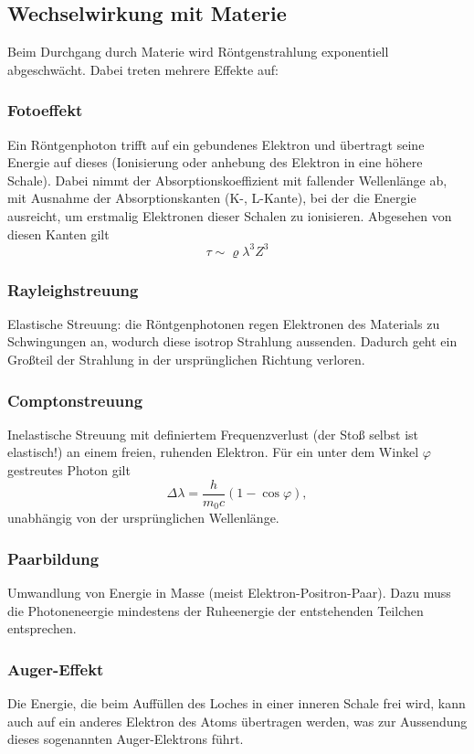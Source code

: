 \documentclass[a4paper]{scrartcl}
\begin{document}
\subsection{Wechselwirkung mit Materie}
Beim Durchgang durch Materie wird Röntgenstrahlung exponentiell abgeschwächt. Dabei treten mehrere Effekte auf:
\subsubsection{Fotoeffekt}
Ein Röntgenphoton trifft auf ein gebundenes Elektron und übertragt seine Energie auf dieses (Ionisierung oder anhebung des Elektron in eine höhere Schale). Dabei nimmt der Absorptionskoeffizient mit fallender Wellenlänge ab, mit Ausnahme der Absorptionskanten (K-, L-Kante), bei der die Energie ausreicht, um erstmalig Elektronen dieser Schalen zu ionisieren. Abgesehen von diesen Kanten gilt 
\begin{equation*}
  \tau \sim \varrho \lambda^3Z^3
  \label{equ:RoentgenAbsorption}
\end{equation*}
\subsubsection{Rayleighstreuung}
Elastische Streuung: die Röntgenphotonen regen Elektronen des Materials zu Schwingungen an, wodurch diese isotrop Strahlung aussenden. Dadurch geht ein Großteil der Strahlung in der ursprünglichen Richtung verloren.
\subsubsection{Comptonstreuung}
Inelastische Streuung mit definiertem Frequenzverlust (der Stoß selbst ist elastisch!) an einem freien, ruhenden Elektron. Für ein unter dem Winkel $\varphi$ gestreutes Photon gilt
\begin{equation*}
  \Delta \lambda=\frac{h}{m_0c}\left(1- \cos \varphi \right),
  \label{equ:Compton}
\end{equation*}
unabhängig von der ursprünglichen Wellenlänge.
\subsubsection{Paarbildung}
Umwandlung von Energie in Masse (meist Elektron-Positron-Paar). Dazu muss die Photoneneergie mindestens der Ruheenergie der entstehenden Teilchen entsprechen.

\subsubsection{Auger-Effekt}
Die Energie, die beim Auffüllen des Loches in einer inneren Schale frei wird, kann auch auf ein anderes Elektron des Atoms übertragen werden, was zur Aussendung dieses sogenannten Auger-Elektrons führt.
\end{document}
